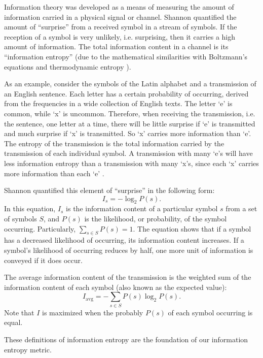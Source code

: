 \documentclass{article}
\begin{document}
Information theory was developed as a means of measuring the amount of
information carried in a physical signal or channel. Shannon
\cite{shannon} quantified the amount of ``surprise'' from a received
symbol in a stream of symbols. If the reception of a symbol is very
unlikely, i.e. surprising, then it carries a high amount of
information. The total information content in a channel is its
``information entropy'' (due to the mathematical similarities with
Boltzmann's equations and thermodynamic entropy \cite{chat_steph}).

As an example, consider the symbols of the Latin alphabet and a
transmission of an English sentence. Each letter has a certain
probability of occurring, derived from the frequencies in a wide
collection of English texts. The letter `e' is common, while `x' is
uncommon. Therefore, when receiving the transmission, i.e. the
sentence, one letter at a time, there will be little surprise if `e'
is transmitted and much surprise if `x' is transmitted. So `x' carries
more information than `e'. The entropy of the transmission is the
total information carried by the transmission of each individual
symbol. A transmission with many `e's will have less information
entropy than a transmission with many `x's, since each `x' carries
more information than each `e' \cite{shannon}.

Shannon \cite{shannon} quantified this element of ``surprise'' in the
following form:
\begin{equation}
  \label{eq:I(s)}
  I_s = - \log_2 P(s).
\end{equation}
In this equation, $I_s$ is the information content of a particular
symbol $s$ from a set of symbols $S$, and $P(s)$ is the likelihood, or
probability, of the symbol occurring. Particularly, $\sum_{s \in S}
P(s) = 1$. The equation shows that if a symbol has a decreased
likelihood of occurring, its information content increases. If a
symbol's likelihood of occurring reduces by half, one more unit of
information is conveyed if it does occur.

The average information content of the transmission is the weighted
sum of the information content of each symbol (also known as the
expected value):
\begin{equation}
  \label{eq:I_avg}
  I_{\textrm{avg}} = - \sum_{s \in S} P(s) \log_2 P(s).
\end{equation}
Note that $I$ is maximized when the probably $P(s)$ of each symbol
occurring is equal.

These definitions of information entropy are the foundation of our
information entropy metric.
\end{document}
